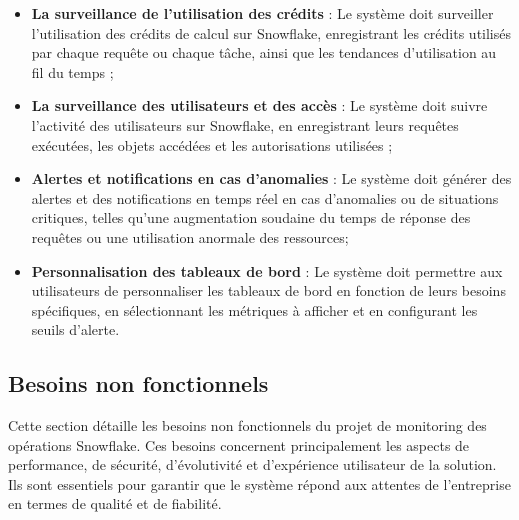\begin{itemize}
            \item \textbf{La surveillance de l'utilisation des crédits} :
            Le système doit surveiller l'utilisation des crédits de calcul sur Snowflake, enregistrant les crédits utilisés par chaque requête ou chaque tâche, ainsi que les tendances d'utilisation au fil du temps ;
            
            \item \textbf{La surveillance des utilisateurs et des accès} :
            Le système doit suivre l'activité des utilisateurs sur Snowflake, en enregistrant leurs requêtes exécutées, les objets accédées et les autorisations utilisées ;
            
            \item \textbf{Alertes et notifications en cas d'anomalies} :
            Le système doit générer des alertes et des notifications en temps réel en cas d'anomalies ou de situations critiques, telles qu'une augmentation soudaine du temps de réponse des requêtes ou une utilisation anormale des ressources; 
            
            \item \textbf{Personnalisation des tableaux de bord} :
            Le système doit permettre aux utilisateurs de personnaliser les tableaux de bord en fonction de leurs besoins spécifiques, en sélectionnant les métriques à afficher et en configurant les seuils d'alerte.
        \end{itemize}        
    \subsection{Besoins non fonctionnels}
  \par Cette section détaille les besoins non fonctionnels du projet de monitoring des opérations Snowflake. 
  Ces besoins concernent principalement les aspects de performance, de sécurité, d'évolutivité et d'expérience utilisateur de la solution. 
  Ils sont essentiels pour garantir que le système répond aux attentes de l'entreprise en termes de qualité et de fiabilité.

